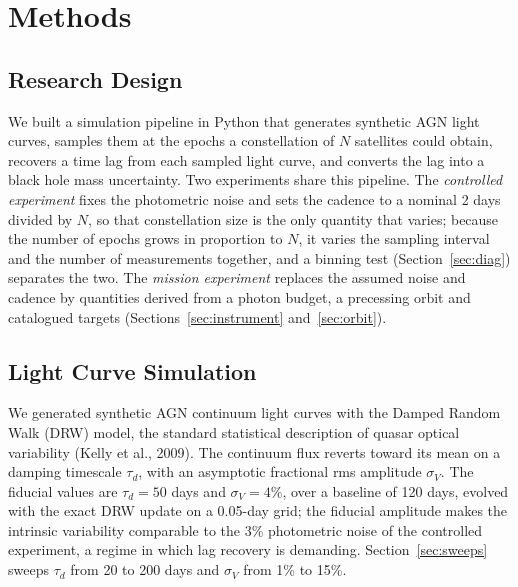 \documentclass[11pt]{article}
\begin{document}
\section{Methods}

\subsection{Research Design}

We built a simulation pipeline in Python that generates synthetic AGN light curves, samples them at the epochs a constellation of $N$ satellites could obtain, recovers a time lag from each sampled light curve, and converts the lag into a black hole mass uncertainty. Two experiments share this pipeline. The \emph{controlled experiment} fixes the photometric noise and sets the cadence to a nominal 2 days divided by $N$, so that constellation size is the only quantity that varies; because the number of epochs grows in proportion to $N$, it varies the sampling interval and the number of measurements together, and a binning test (Section~\ref{sec:diag}) separates the two. The \emph{mission experiment} replaces the assumed noise and cadence by quantities derived from a photon budget, a precessing orbit and catalogued targets (Sections~\ref{sec:instrument} and~\ref{sec:orbit}).

\subsection{Light Curve Simulation}

We generated synthetic AGN continuum light curves with the Damped Random Walk (DRW) model, the standard statistical description of quasar optical variability (Kelly et al., 2009). The continuum flux reverts toward its mean on a damping timescale $\tau_d$, with an asymptotic fractional rms amplitude $\sigma_V$. The fiducial values are $\tau_d = 50$ days and $\sigma_V = 4\%$, over a baseline of 120 days, evolved with the exact DRW update on a 0.05-day grid; the fiducial amplitude makes the intrinsic variability comparable to the 3\% photometric noise of the controlled experiment, a regime in which lag recovery is demanding. Section~\ref{sec:sweeps} sweeps $\tau_d$ from 20 to 200 days and $\sigma_V$ from 1\% to 15\%.
\end{document}
